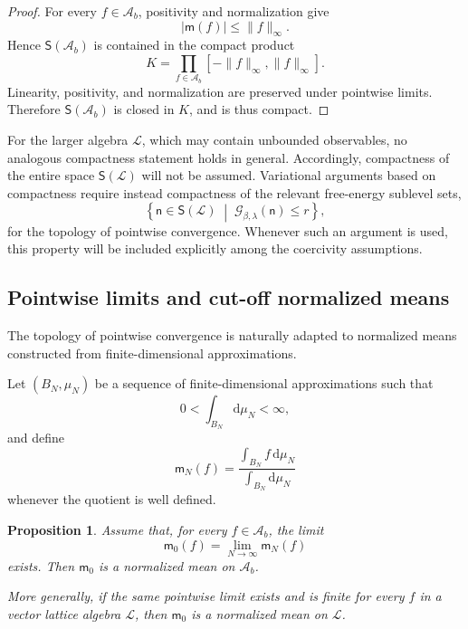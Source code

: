 \documentclass[11pt,reqno]{amsart}
\newtheorem{Proposition}[Theorem]{Proposition}
\begin{document}
\begin{proof}
For every $f\in\mathcal A_b$, positivity and normalization give
\[
|\mathsf m(f)|\leq\|f\|_\infty.
\]
Hence $\mathsf S(\mathcal A_b)$ is contained in the compact product
\[
K
=
\prod_{f\in\mathcal A_b}
[-\|f\|_\infty,\|f\|_\infty].
\]
Linearity, positivity, and normalization are preserved under pointwise
limits. Therefore $\mathsf S(\mathcal A_b)$ is closed in $K$, and is
thus compact.
\end{proof}

For the larger algebra $\mathcal L$, which may contain unbounded
observables, no analogous compactness statement holds in general.
Accordingly, compactness of the entire space $\mathsf S(\mathcal L)$
will not be assumed. Variational arguments based on compactness require
instead compactness of the relevant free-energy sublevel sets,
\[
\left\{
\mathsf n\in\mathsf S(\mathcal L)
\;\middle|\;
\mathcal G_{\beta,\lambda}(\mathsf n)\leq r
\right\},
\]
for the topology of pointwise convergence. Whenever such an argument is
used, this property will be included explicitly among the coercivity
assumptions.

\subsection{Pointwise limits and cut-off normalized means}
\label{subsec:cutoff-limits}

The topology of pointwise convergence is naturally adapted to
normalized means constructed from finite-dimensional approximations.

Let $(B_N,\mu_N)$ be a sequence of finite-dimensional approximations
such that
\[
0<\int_{B_N}\mathrm d\mu_N<\infty,
\]
and define
\[
\mathsf m_N(f)
=
\frac{
\displaystyle\int_{B_N}f\,\mathrm d\mu_N
}{
\displaystyle\int_{B_N}\mathrm d\mu_N
}
\]
whenever the quotient is well defined.

\begin{Proposition}
\label{prop:cutoff-pointwise-limit}
Assume that, for every $f\in\mathcal A_b$, the limit
\[
\mathsf m_0(f)
=
\lim_{N\to\infty}\mathsf m_N(f)
\]
exists. Then $\mathsf m_0$ is a normalized mean on $\mathcal A_b$.

More generally, if the same pointwise limit exists and is finite for
every $f$ in a vector lattice algebra $\mathcal L$, then $\mathsf m_0$
is a normalized mean on $\mathcal L$.
\end{Proposition}
\end{document}
